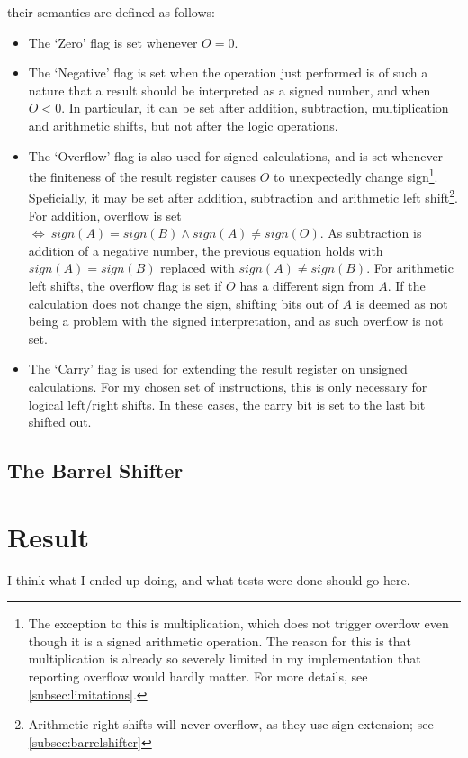 \documentclass{article}
\begin{document}
their semantics are defined as follows:
\begin{itemize}
\item The `Zero' flag is set whenever $O = 0$.
\item The `Negative' flag is set when the operation just performed is of such a nature that a result should be interpreted as a signed number, and when $O < 0$. In particular, it can be set after addition, subtraction, multiplication and arithmetic shifts, but not after the logic operations.
\item The `Overflow' flag is also used for signed calculations, and is set whenever the finiteness of the result register causes $O$ to unexpectedly change sign\footnote{The exception to this is multiplication, which does not trigger overflow even though it is a signed arithmetic operation. The reason for this is that multiplication is already so severely limited in my implementation that reporting overflow would hardly matter. For more details, see \autoref{subsec:limitations}.}. Speficially, it may be set after addition, subtraction and arithmetic left shift\footnote{Arithmetic right shifts will never overflow, as they use sign extension; see \autoref{subsec:barrelshifter}}. For addition, overflow is set~$\iff~sign(A)=sign(B)\wedge{}sign(A)\neq{}sign(O)$. As subtraction is addition of a negative number, the previous equation holds with $sign(A)=sign(B)$ replaced with $sign(A)\neq{}sign(B)$. For arithmetic left shifts, the overflow flag is set if $O$ has a different sign from $A$. If the calculation does not change the sign, shifting bits out of $A$ is deemed as not being a problem with the signed interpretation, and as such overflow is not set.
\item The `Carry' flag is used for extending the result register on unsigned calculations. For my chosen set of instructions, this is only necessary for logical left/right shifts. In these cases, the carry bit is set to the last bit shifted out.
\end{itemize}

\subsection{The Barrel Shifter}
\label{subsec:barrelshifter}


\section{Result}
\label{sec:result}
I think what I ended up doing, and what tests were done should go here.
\end{document}
